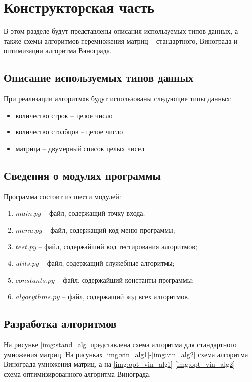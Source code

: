 \chapter{Конструкторская часть}
В этом разделе будут представлены описания используемых типов данных, а также схемы алгоритмов перемножения матриц -- стандартного, Винограда и оптимизации алгоритма Винограда.

\section{Описание используемых типов данных}

При реализации алгоритмов будут использованы следующие типы данных:

\begin{itemize}
	\item количество строк -- целое число
	\item количество столбцов -- целое число
	\item матрица -- двумерный список целых чисел
\end{itemize}


\section{Сведения о модулях программы}
Программа состоит из шести модулей:
\begin{enumerate}[label=\arabic*)]
	\item $main.py$ -- файл, содержащий точку входа;
    \item $menu.py$ -- файл, содержащий код меню программы;
    \item $test.py$ -- файл, содержайший код тестирования алгоритмов;
    \item $utils.py$ -- файл, содержащий служебные алгоритмы;
    \item $constants.py$ -- файл, содержайший константы программы;
    \item $algorythms.py$ -- файл, содержащий код всех алгоритмов. \newline
\end{enumerate}

\section{Разработка алгоритмов}
На рисунке \ref{img:stand_alg} представлена схема алгоритма для стандартного умножения матриц. На рисунках \ref{img:vin_alg1}-\ref{img:vin_alg2} схема алгоритма Винограда умножения матриц, а на \ref{img:opt_vin_alg1}-\ref{img:opt_vin_alg2} -- схема оптимизированного алгоритма Винограда.

